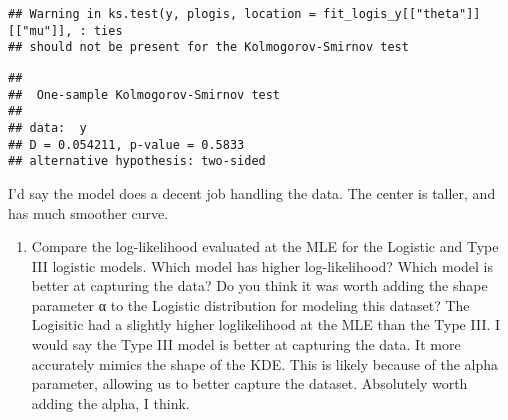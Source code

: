 \documentclass[
]{article}
\providecommand{\tightlist}{%
  \setlength{\itemsep}{0pt}\setlength{\parskip}{0pt}}
\begin{document}
\begin{verbatim}
## Warning in ks.test(y, plogis, location = fit_logis_y[["theta"]][["mu"]], : ties
## should not be present for the Kolmogorov-Smirnov test
\end{verbatim}

\begin{verbatim}
## 
##  One-sample Kolmogorov-Smirnov test
## 
## data:  y
## D = 0.054211, p-value = 0.5833
## alternative hypothesis: two-sided
\end{verbatim}

I'd say the model does a decent job handling the data. The center is
taller, and has much smoother curve.

\begin{enumerate}
\def\labelenumi{\alph{enumi})}
\setcounter{enumi}{4}
\tightlist
\item
  Compare the log-likelihood evaluated at the MLE for the Logistic and
  Type III logistic models. Which model has higher log-likelihood? Which
  model is better at capturing the data? Do you think it was worth
  adding the shape parameter α to the Logistic distribution for modeling
  this dataset? The Logisitic had a slightly higher loglikelihood at the
  MLE than the Type III. I would say the Type III model is better at
  capturing the data. It more accurately mimics the shape of the KDE.
  This is likely because of the alpha parameter, allowing us to better
  capture the dataset. Absolutely worth adding the alpha, I think.
\end{enumerate}
\end{document}
